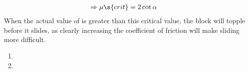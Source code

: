 \begin{problem}[A1987FMIIQ1l]
{\begin{enumerate}
\begin{align*}
\Rightarrow \mu\s{crit}&= 2\cot{\alpha}
 \end{align*}
 When the actual value of \vari{\mu} is greater than this critical value, the block will topple before it slides, as clearly increasing the coefficient of friction will make sliding more difficult. 
 	\begin{enumerate}
 		\item {}
		\item {}
	\end{enumerate}
\end{enumerate}
}
\end{problem}